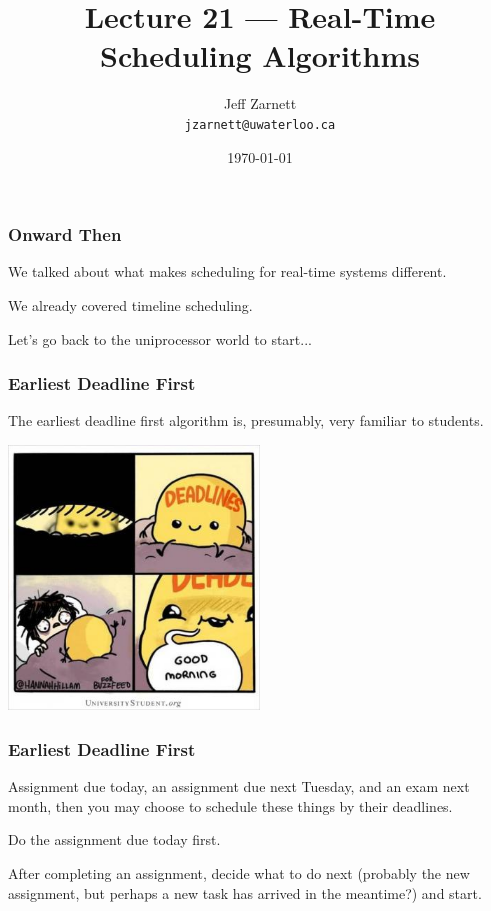 

\title{Lecture 21 --- Real-Time Scheduling Algorithms }

\author{Jeff Zarnett \\ \small \texttt{jzarnett@uwaterloo.ca}}
\date{\today}




\begin{frame}
  \titlepage

 \end{frame}


\begin{frame}
\frametitle{Onward Then}

We talked about what makes scheduling for real-time systems different.

We already covered timeline scheduling.

Let's go back to the uniprocessor world to start...

\end{frame}


\begin{frame}
\frametitle{Earliest Deadline First}

The earliest deadline first algorithm is, presumably, very familiar to students. 

\begin{center}
	\includegraphics[width=0.5\textwidth]{images/deadlines.jpg}
\end{center}

\end{frame}


\begin{frame}
\frametitle{Earliest Deadline First}

Assignment due today, an assignment due next Tuesday, and an exam next month, then you may choose to schedule these things by their deadlines. 

Do the assignment due today first. 

After completing an assignment, decide what to do next (probably the new assignment, but perhaps a new task has arrived in the meantime?) and start.


\end{frame}

